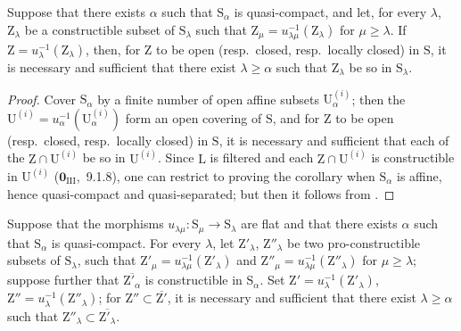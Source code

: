 \begin{corollary}[8.3.12]
\label{IV.8.3.12}
Suppose that there exists $\alpha$ such that $\mathrm{S}_\alpha$ is quasi-compact, and let, for every $\lambda$, $\mathrm{Z}_\lambda$ be a constructible subset of $\mathrm{S}_\lambda$ such that $\mathrm{Z}_\mu=u_{\lambda\mu}^{-1}(\mathrm{Z}_\lambda)$ for $\mu\geqslant\lambda$.
If $\mathrm{Z}=u_\lambda^{-1}(\mathrm{Z}_\lambda)$,
then, for $\mathrm{Z}$ to be open (resp.\ closed, resp.\ locally closed) in $\mathrm{S}$, it is necessary and sufficient that there exist $\lambda\geqslant\alpha$ such that $\mathrm{Z}_\lambda$ be so in $\mathrm{S}_\lambda$.
\end{corollary}

\begin{proof}
Cover $\mathrm{S}_\alpha$ by a finite number of open affine subsets $\mathrm{U}_\alpha^{(i)}$; then the $\mathrm{U}^{(i)}=u_\alpha^{-1}(\mathrm{U}_\alpha^{(i)})$ form an open covering of $\mathrm{S}$, and for $\mathrm{Z}$ to be open (resp.\ closed, resp.\ locally closed) in $\mathrm{S}$, it is necessary and sufficient that each of the $\mathrm{Z}\cap\mathrm{U}^{(i)}$ be so in $\mathrm{U}^{(i)}$.
Since $\mathrm{L}$ is filtered and each $\mathrm{Z}\cap\mathrm{U}^{(i)}$ is constructible in $\mathrm{U}^{(i)}$ ($\mathbf{0}_{\mathrm{III}}$,~9.1.8), one can restrict to proving the corollary when $\mathrm{S}_\alpha$ is affine, hence quasi-compact and quasi-separated; but then it follows from .
\end{proof}

\begin{proposition}[8.3.13]
\label{IV.8.3.13}
Suppose that the morphisms $u_{\lambda\mu}:\mathrm{S}_\mu\to\mathrm{S}_\lambda$ are flat and that there exists $\alpha$ such that $\mathrm{S}_\alpha$ is quasi-compact.
For every $\lambda$, let $\mathrm{Z}'_\lambda$, $\mathrm{Z}''_\lambda$ be two pro-constructible subsets of $\mathrm{S}_\lambda$, such that $\mathrm{Z}'_\mu=u_{\lambda\mu}^{-1}(\mathrm{Z}'_\lambda)$ and $\mathrm{Z}''_\mu=u_{\lambda\mu}^{-1}(\mathrm{Z}''_\lambda)$ for $\mu\geqslant\lambda$; suppose further that $\overline{\mathrm{Z}'_\alpha}$ is constructible in $\mathrm{S}_\alpha$.
Set $\mathrm{Z}'=u_\lambda^{-1}(\mathrm{Z}'_\lambda)$, $\mathrm{Z}''=u_\lambda^{-1}(\mathrm{Z}''_\lambda)$; for $\mathrm{Z}''\subset\overline{\mathrm{Z}'}$, it is necessary and sufficient that there exist $\lambda\geqslant\alpha$ such that $\mathrm{Z}''_\lambda\subset\overline{\mathrm{Z}'_\lambda}$.
\end{proposition}

